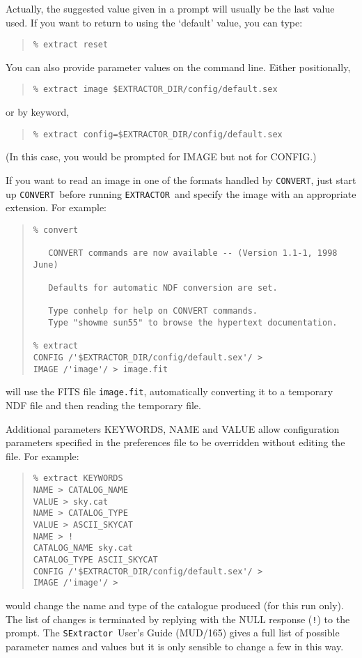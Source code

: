 \documentclass[twoside,11pt]{article}
\newcommand{\htmladdnormallink}[2]{#1}
\newcommand{\latex}[1]{#1}
\newcommand{\xref}[3]{#1}
\renewcommand{\_}{\texttt{\symbol{95}}}
\newcommand{\EXTRACTOR}{\texttt{EXTRACTOR}}
\newcommand{\CONVERT}{\texttt{CONVERT}}
\newcommand{\SExtractor}{\texttt{SExtractor}}
\newcommand{\MUD}{mud165.ps}
\begin{document}
Actually, the suggested value given in a prompt will usually be the last value
used. If you want to return to using the `default' value, you can type:
\begin{quote} \begin{verbatim}
% extract reset
\end{verbatim} \end{quote}

You can also provide parameter values on the command line.
Either positionally,
\begin{quote} \begin{verbatim}
% extract image $EXTRACTOR_DIR/config/default.sex
\end{verbatim} \end{quote}
or by keyword,
\begin{quote} \begin{verbatim}
% extract config=$EXTRACTOR_DIR/config/default.sex
\end{verbatim} \end{quote}
(In this case, you would be prompted for IMAGE but not for CONFIG.)

If you want to read an image in one of the 
\xref{formats handled by \CONVERT}{sun55}{the_default_conversion_commands}, 
just start up \CONVERT\ before running \EXTRACTOR\ and specify the image with 
an appropriate extension. For example:

\begin{quote} \begin{verbatim}
% convert

   CONVERT commands are now available -- (Version 1.1-1, 1998 June)

   Defaults for automatic NDF conversion are set.

   Type conhelp for help on CONVERT commands.
   Type "showme sun55" to browse the hypertext documentation.

% extract
CONFIG /'$EXTRACTOR_DIR/config/default.sex'/ >
IMAGE /'image'/ > image.fit
\end{verbatim} \end{quote}
will use the FITS file \texttt{image.fit}, automatically converting it to a
temporary NDF file and then reading the temporary file.

Additional parameters KEYWORDS, NAME and VALUE allow
configuration parameters specified in the preferences file to be overridden 
without editing the file. For example:
\begin{quote} \begin{verbatim}
% extract KEYWORDS
NAME > CATALOG_NAME
VALUE > sky.cat
NAME > CATALOG_TYPE
VALUE > ASCII_SKYCAT
NAME > !
CATALOG_NAME sky.cat
CATALOG_TYPE ASCII_SKYCAT
CONFIG /'$EXTRACTOR_DIR/config/default.sex'/ >
IMAGE /'image'/ >
\end{verbatim} \end{quote}
would change the name and type of the catalogue produced (for this
run only). The list of changes is terminated by replying with the NULL 
response (\texttt{!}) to the prompt.
The 
\htmladdnormallink{\SExtractor\ User's Guide}{\MUD}\latex{ (MUD/165)}
gives a full list of possible parameter names and values but it is only 
sensible to change a few in this way.
\end{document}
